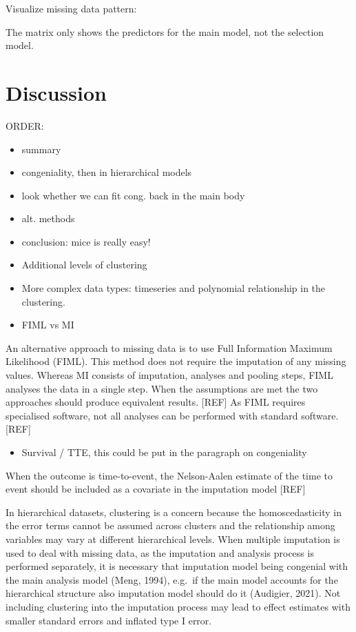 \documentclass[
]{jss}
\providecommand{\tightlist}{%
  \setlength{\itemsep}{0pt}\setlength{\parskip}{0pt}}
\begin{document}
Visualize missing data pattern:

The matrix only shows the predictors for the main model, not the
selection model.

\hypertarget{discussion}{%
\section{Discussion}\label{discussion}}

ORDER:

\begin{itemize}
\item
  summary
\item
  congeniality, then in hierarchical models
\item
  look whether we can fit cong. back in the main body
\item
  alt. methods
\item
  conclusion: mice is really easy!
\item
  Additional levels of clustering
\item
  More complex data types: timeseries and polynomial relationship in the
  clustering.
\item
  FIML vs MI
\end{itemize}

An alternative approach to missing data is to use Full Information
Maximum Likelihood (FIML). This method does not require the imputation
of any missing values. Whereas MI consists of imputation, analyses and
pooling steps, FIML analyses the data in a single step. When the
assumptions are met the two approaches should produce equivalent
results. {[}REF{]} As FIML requires specialised software, not all
analyses can be performed with standard software. {[}REF{]}

\begin{itemize}
\tightlist
\item
  Survival / TTE, this could be put in the paragraph on congeniality
\end{itemize}

When the outcome is time-to-event, the Nelson-Aalen estimate of the time
to event should be included as a covariate in the imputation model
{[}REF{]}

In hierarchical datasets, clustering is a concern because the
homoscedasticity in the error terms cannot be assumed across clusters
and the relationship among variables may vary at different hierarchical
levels. When multiple imputation is used to deal with missing data, as
the imputation and analysis process is performed separately, it is
necessary that imputation model being congenial with the main analysis
model (Meng, 1994), e.g.~if the main model accounts for the hierarchical
structure also imputation model should do it (Audigier, 2021). Not
including clustering into the imputation process may lead to effect
estimates with smaller standard errors and inflated type I error.
\end{document}
